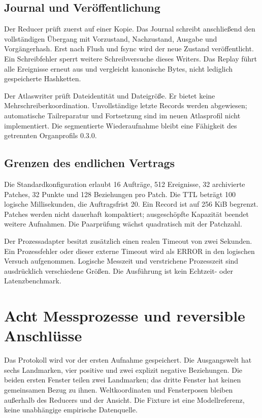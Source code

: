 \documentclass[11pt,a4paper]{article}
\newcommand{\nextsection}[2]{\clearpage{\color{accent}\small\textsf{#1}}\section{#2}}
\begin{document}
\subsection{Journal und Veröffentlichung}
Der Reducer prüft zuerst auf einer Kopie. Das Journal schreibt
anschließend den vollständigen Übergang mit Vorzustand, Nachzustand,
Ausgabe und Vorgängerhash. Erst nach Flush und fsync wird der neue
Zustand veröffentlicht. Ein Schreibfehler sperrt weitere Schreibversuche
dieses Writers. Das Replay führt alle Ereignisse erneut aus und
vergleicht kanonische Bytes, nicht lediglich gespeicherte Hashketten.

Der Atlaswriter prüft Dateidentität und Dateigröße. Er bietet keine
Mehrschreiberkoordination. Unvollständige letzte Records werden
abgewiesen; automatische Tailreparatur und Fortsetzung sind im neuen
Atlasprofil nicht implementiert. Die segmentierte Wiederaufnahme
bleibt eine Fähigkeit des getrennten Organprofils 0.3.0.

\subsection{Grenzen des endlichen Vertrags}
Die Standardkonfiguration erlaubt 16 Aufträge, 512 Ereignisse,
32 archivierte Patches, 32 Punkte und 128 Beziehungen pro Patch.
Die TTL beträgt 100 logische Millisekunden, die Auftragsfrist 20.
Ein Record ist auf 256 KiB begrenzt. Patches werden nicht dauerhaft
kompaktiert; ausgeschöpfte Kapazität beendet weitere Aufnahmen.
Die Paarprüfung wächst quadratisch mit der Patchzahl.

Der Prozessadapter besitzt zusätzlich einen realen Timeout von zwei
Sekunden. Ein Prozessfehler oder dieser externe Timeout wird als
ERROR in den logischen Versuch aufgenommen. Logische Messzeit und
verstrichene Prozesszeit sind ausdrücklich verschiedene Größen.
Die Ausführung ist kein Echtzeit- oder Latenzbenchmark.

\nextsection{32 / KARTENVERSUCH}{Acht Messprozesse und reversible Anschlüsse}
Das Protokoll wird vor der ersten Aufnahme gespeichert. Die Ausgangswelt
hat sechs Landmarken, vier positive und zwei explizit negative
Beziehungen. Die beiden ersten Fenster teilen zwei Landmarken;
das dritte Fenster hat keinen gemeinsamen Bezug zu ihnen.
Weltkoordinaten und Fensterposen bleiben außerhalb des Reducers
und der Ansicht. Die Fixture ist eine Modellreferenz, keine
unabhängige empirische Datenquelle.
\end{document}
